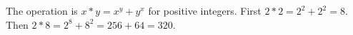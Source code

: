 The operation is $x*y=x^y+y^x$ for positive integers. First $2*2=2^2+2^2=8$. Then $2*8=2^8+8^2=256+64=\boxed{320}$.
